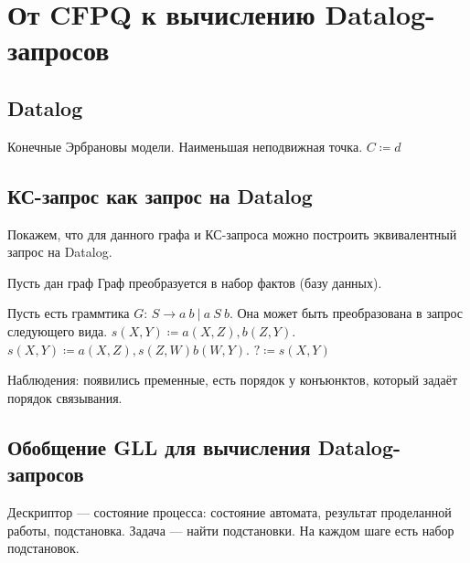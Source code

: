 \section{От CFPQ к вычислению Datalog-запросов}

\subsection{Datalog}
Конечные Эрбрановы модели.
Наименьшая неподвижная точка.
$C \coloneq d$


\subsection{КС-запрос как запрос на Datalog}

Покажем, что для данного графа и КС-запроса можно построить эквивалентный запрос на Datalog.

Пусть дан граф
Граф преобразуется в набор фактов (базу данных).

Пусть есть граммтика $G$: $S \rightarrow a \ b \ | \ a \ S \ b$.
Она может быть преобразована в запрос следующего вида.
$s(X,Y) \coloneq a(X,Z), b(Z,Y). $
$s(X,Y) \coloneq a(X,Z), s(Z,W) b(W,Y). $
$? \coloneq s(X,Y)$

Наблюдения: появились пременные, есть порядок у конъюнктов, который задаёт порядок связывания.

\subsection{Обобщение GLL для вычисления Datalog-запросов}
Дескриптор --- состояние процесса: состояние автомата, результат проделанной работы, подстановка.
Задача --- найти подстановки.
На каждом шаге есть набор подстановок.
